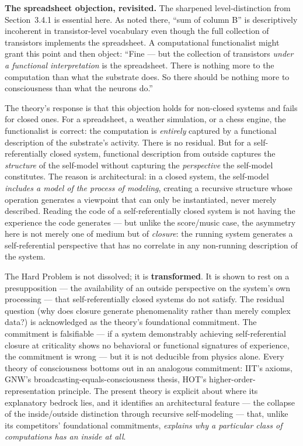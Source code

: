 \documentclass[12pt]{article}
\newcommand{\revstart}{}
\newcommand{\revend}{}
\begin{document}
{\revstart\textbf{The spreadsheet objection, revisited.} The sharpened level-distinction from Section~3.4.1 is essential here. As noted there, ``sum of column B'' is descriptively incoherent in transistor-level vocabulary even though the full collection of transistors implements the spreadsheet. A computational functionalist might grant this point and then object: ``Fine --- but the collection of transistors \emph{under a functional interpretation} is the spreadsheet. There is nothing more to the computation than what the substrate does. So there should be nothing more to consciousness than what the neurons do.''

The theory's response is that this objection holds for non-closed systems and fails for closed ones. For a spreadsheet, a weather simulation, or a chess engine, the functionalist is correct: the computation is \emph{entirely} captured by a functional description of the substrate's activity. There is no residual. But for a self-referentially closed system, functional description from outside captures the \emph{structure} of the self-model without capturing the \emph{perspective} the self-model constitutes. The reason is architectural: in a closed system, the self-model \emph{includes a model of the process of modeling}, creating a recursive structure whose operation generates a viewpoint that can only be instantiated, never merely described. Reading the code of a self-referentially closed system is not having the experience the code generates --- but unlike the score/music case, the asymmetry here is not merely one of medium but of \emph{closure}: the running system generates a self-referential perspective that has no correlate in any non-running description of the system.

The Hard Problem is not dissolved; it is \textbf{transformed}. It is shown to rest on a presupposition --- the availability of an outside perspective on the system's own processing --- that self-referentially closed systems do not satisfy. The residual question (why does closure generate phenomenality rather than merely complex data?) is acknowledged as the theory's foundational commitment. The commitment is falsifiable --- if a system demonstrably achieving self-referential closure at criticality shows no behavioral or functional signatures of experience, the commitment is wrong --- but it is not deducible from physics alone. Every theory of consciousness bottoms out in an analogous commitment: IIT's axioms, GNW's broadcasting-equals-consciousness thesis, HOT's higher-order-representation principle. The present theory is explicit about where its explanatory bedrock lies, and it identifies an architectural feature --- the collapse of the inside/outside distinction through recursive self-modeling --- that, unlike its competitors' foundational commitments, \emph{explains why a particular class of computations has an inside at all}.\revend}
\end{document}
